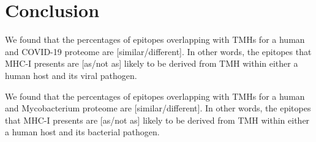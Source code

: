 \documentclass{article}
\newcommand{\richel}[1]{\textcolor{orange}{\textbf{[RB: #1]}}}
\begin{document}










\section{Conclusion}

We found that the percentages of epitopes overlapping 
with TMHs for a human and COVID-19 proteome are 
[similar/different]. In other words, the
epitopes that MHC-I presents are [as/not as] likely 
to be derived from TMH within either a human host and its viral pathogen.

We found that the percentages of epitopes overlapping 
with TMHs for a human and Mycobacterium proteome are 
[similar/different]. In other words, the
epitopes that MHC-I presents are [as/not as] likely 
to be derived from TMH within either a human host and its bacterial pathogen.
\end{document}

